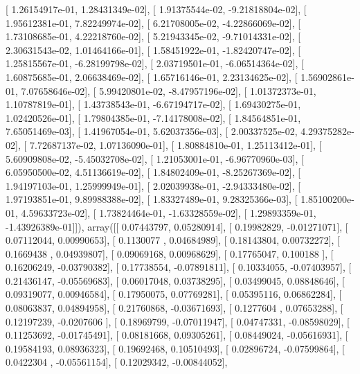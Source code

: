 \documentclass{article}
\begin{document}
       [  1.26154917e-01,   1.28431349e-02],
       [  1.91375544e-02,  -9.21818804e-02],
       [  1.95612381e-01,   7.82249974e-02],
       [  6.21708005e-02,  -4.22866069e-02],
       [  1.73108685e-01,   4.22218760e-02],
       [  5.21943345e-02,  -9.71014331e-02],
       [  2.30631543e-02,   1.01464166e-01],
       [  1.58451922e-01,  -1.82420747e-02],
       [  1.25815567e-01,  -6.28199798e-02],
       [  2.03719501e-01,  -6.06514364e-02],
       [  1.60875685e-01,   2.06638469e-02],
       [  1.65716146e-01,   2.23134625e-02],
       [  1.56902861e-01,   7.07658646e-02],
       [  5.99420801e-02,  -8.47957196e-02],
       [  1.01372373e-01,   1.10787819e-01],
       [  1.43738543e-01,  -6.67194717e-02],
       [  1.69430275e-01,   1.02420526e-01],
       [  1.79804385e-01,  -7.14178008e-02],
       [  1.84564851e-01,   7.65051469e-03],
       [  1.41967054e-01,   5.62037356e-03],
       [  2.00337525e-02,   4.29375282e-02],
       [  7.72687137e-02,   1.07136090e-01],
       [  1.80884810e-01,   1.25113412e-01],
       [  5.60909808e-02,  -5.45032708e-02],
       [  1.21053001e-01,  -6.96770960e-03],
       [  6.05950500e-02,   4.51136619e-02],
       [  1.84802409e-01,  -8.25267369e-02],
       [  1.94197103e-01,   1.25999949e-01],
       [  2.02039938e-01,  -2.94333480e-02],
       [  1.97193851e-01,   9.89988388e-02],
       [  1.83327489e-01,   9.28325366e-03],
       [  1.85100200e-01,   4.59633723e-02],
       [  1.73824464e-01,  -1.63328559e-02],
       [  1.29893359e-01,  -1.43926389e-01]]), array([[ 0.07443797,  0.05280914],
       [ 0.19982829, -0.01271071],
       [ 0.07112044,  0.00990653],
       [ 0.1130077 ,  0.04684989],
       [ 0.18143804,  0.00732272],
       [ 0.1669438 ,  0.04939807],
       [ 0.09069168,  0.00968629],
       [ 0.17765047,  0.100188  ],
       [ 0.16206249, -0.03790382],
       [ 0.17738554, -0.07891811],
       [ 0.10334055, -0.07403957],
       [ 0.21436147, -0.05569683],
       [ 0.06017048,  0.03738295],
       [ 0.03499045,  0.08848646],
       [ 0.09319077,  0.00946584],
       [ 0.17950075,  0.07769281],
       [ 0.05395116,  0.06862284],
       [ 0.08063837,  0.04894958],
       [ 0.21760868, -0.03671693],
       [ 0.1277604 ,  0.07653288],
       [ 0.12197239, -0.0207606 ],
       [ 0.18969799, -0.07011947],
       [ 0.04747331, -0.08598029],
       [ 0.11253692, -0.01745491],
       [ 0.08181668,  0.09305261],
       [ 0.08449024, -0.05616931],
       [ 0.19584193,  0.08936323],
       [ 0.19692468,  0.10510493],
       [ 0.02896724, -0.07599864],
       [ 0.0422304 , -0.05561154],
       [ 0.12029342, -0.00844052],
\end{document}
